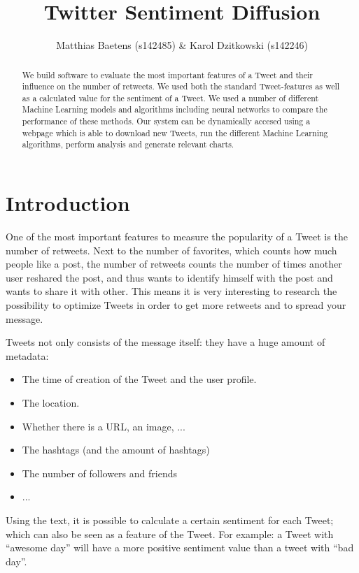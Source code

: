 \documentclass[10pt]{IEEEtran}
\title{Twitter Sentiment Diffusion}
\author{Matthias Baetens (s142485) \& Karol Dzitkowski (s142246)}
\begin{document}
\maketitle

\begin{abstract}
We build software to evaluate the most important features of a Tweet and their influence on the number of retweets. We used both the standard Tweet-features as well as a calculated value for the sentiment of a Tweet. We used a number of different Machine Learning models and algorithms including neural networks to compare the performance of these methods. Our system can be dynamically accesed using a webpage which is able to download new Tweets, run the different Machine Learning algorithms, perform analysis and generate relevant charts. 
\end{abstract}

\section{Introduction}
One of the most important features to measure the popularity of a Tweet is the number of retweets. Next to the number of favorites, which counts how much people like a post, the number of retweets counts the number of times another user reshared the post, and thus wants to identify himself with the post and wants to share it with other. This means it is very interesting to research the possibility to optimize Tweets in order to get more retweets and to spread your message. 

Tweets not only consists of the message itself: they have a huge amount of metadata: 
\begin{itemize}
	\item The time of creation of the Tweet and the user profile.
	\item The location. 
	\item Whether there is a URL, an image, ...
	\item The hashtags (and the amount of hashtags)
	\item The number of followers and friends
	\item ...
\end{itemize}

Using the text, it is possible to calculate a certain sentiment for each Tweet; which can also be seen as a feature of the Tweet. For example: a Tweet with ``awesome day'' will have a more positive sentiment value than a tweet with ``bad day''.
\end{document}
